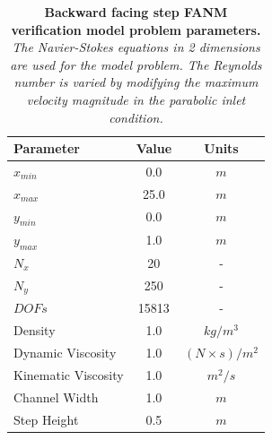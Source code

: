 \begin{table}[h!]
  \begin{center}
    \begin{tabular}{lcc}\hline\hline
      \multicolumn{1}{l}{Parameter}& 
      \multicolumn{1}{c}{Value}&
      \multicolumn{1}{c}{Units}\\\hline
      $x_{min}$ & 0.0 & $m$ \\
      $x_{max}$ & 25.0 & $m$ \\
      $y_{min}$ & 0.0 & $m$ \\
      $y_{max}$ & 1.0 & $m$ \\
      $N_x$ & 20 & - \\
      $N_y$ & 250 & - \\
      $DOFs$ & 15813 & - \\
      Density & 1.0 & $kg / m^3$ \\
      Dynamic Viscosity & 1.0 & $(N \times s) / m^2$ \\
      Kinematic Viscosity & 1.0 & $m^2 / s$ \\
      Channel Width & 1.0 & $m$ \\
      Step Height & 0.5 & $m$ \\
      \hline\hline
    \end{tabular}
  \end{center}
  \caption{\textbf{Backward facing step FANM verification model
      problem parameters.}  \textit{The Navier-Stokes equations in 2
      dimensions are used for the model problem. The Reynolds number
      is varied by modifying the maximum velocity magnitude in the
      parabolic inlet condition.}}
  \label{tab:backward_step_parameters}
\end{table}

